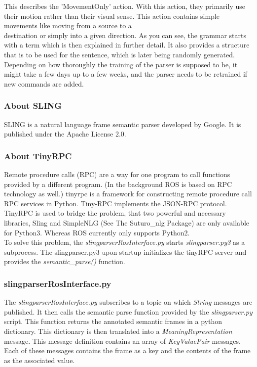 \documentclass[main.tex]{subfiles}
\begin{document}
            This describes the 'MovementOnly' action.
            With this action, they primarily use their motion rather than their visual sense. This action contains simple movements like moving from a source to a\\ destination or simply into a given direction.            
            As you can see, the grammar starts with a term which is then explained in further detail. It also provides a structure that is to be used for the sentence, which is later being randomly generated.\\ 
            Depending on how thoroughly the training of the parser is supposed to be, it might take a few days up to a few weeks, and the parser needs to be retrained if new commands are added.
        
        \subsubsection{About SLING}
            SLING is a natural language frame semantic parser developed by Google. It is published under the Apache License 2.0.
        \subsubsection{About TinyRPC}
             Remote procedure calls (RPC) are a way for one program to call functions provided by a different program. (In the background ROS is based on RPC technology as well.) tinyrpc is a framework for constructing remote procedure call RPC services in Python. Tiny-RPC implements the JSON-RPC protocol.\\
             TinyRPC is used to bridge the problem, that two powerful and necessary libraries, Sling and SimpleNLG (See The Suturo\_nlg Package) are only available for Python3. Whereas ROS currently only supports Python2.\\
             To solve this problem, the \textit{slingparserRosInterface.py} starts \textit{slingparser.py3} as a subprocess. The slingparser.py3 upon startup initializes the tinyRPC server and provides the \textit{semantic\_parse()} function.
        \subsubsection[slingparserros]{slingparserRosInterface.py}
            The \textit{slingparserRosInterface.py} subscribes to a topic on which \textit{String} messages are published. It then calls the semantic parse function provided by the \textit{slingparser.py} script. This function returns the annotated semantic frames in a python dictionary. This dictionary is then translated into a \textit{MeaningRepresentation} message. This message definition contains an array of \textit{KeyValuePair} messages. Each of these messages contains the frame as a key and the contents of the frame as the associated value.
\end{document}
